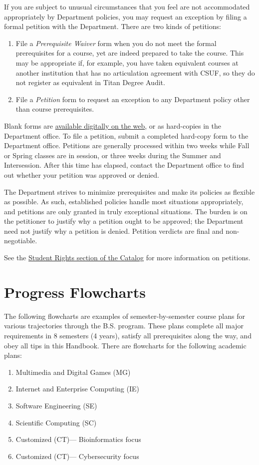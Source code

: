 \documentclass{book}
\newcommand{\campusname}{CSUF}
\newcommand{\mgtrackname}{Multimedia and Digital Games (MG)}
\newcommand{\ietrackname}{Internet and Enterprise Computing (IE)}
\newcommand{\setrackname}{Software Engineering (SE)}
\newcommand{\sctrackname}{Scientific Computing (SC)}
\newcommand{\cttrackname}{Customized (CT)}
\newcommand{\ctbiotrackname}{\cttrackname --- Bioinformatics focus}
\newcommand{\ctsecuritytrackname}{\cttrackname --- Cybersecurity focus}
\begin{document}
If you are subject to unusual circumstances that you feel are not accommodated appropriately by Department policies, you may request an exception by filing a formal petition with the Department. There are two kinds of petitions:
\begin{enumerate}
\item File a \emph{Prerequisite Waiver} form when you do not meet the formal prerequisites for a course, yet are indeed prepared to take the course. This may be appropriate if, for example, you have taken equivalent courses at another institution that has no articulation agreement with \campusname, so they do not register as equivalent in Titan Degree Audit.
\item File a \emph{Petition} form to request an exception to any Department policy other than course prerequisites.
\end{enumerate}

Blank forms are \href{http://fullerton.edu/ecs/cs/resources/formsDocuments.asp}{available digitally on the web}, or as hard-copies in the Department office. To file a petition, submit a completed hard-copy form to the Department office. Petitions are generally processed within two weeks while Fall or Spring classes are in session, or three weeks during the Summer and Intersession. After this time has elapsed, contact the Department office to find out whether your petition was approved or denied.

The Department strives to minimize prerequisites and make its policies as flexible as possible. As such, established policies handle most situations appropriately, and petitions are only granted in truly exceptional situations. The burden is on the petitioner to justify why a petition ought to be approved; the Department need not justify why a petition is denied. Petition verdicts are final and non-negotiable.

See the \href{http://catalog.fullerton.edu/content.php?catoid=2&navoid=115#Student_Rights}{Student Rights section of the Catalog} for more information on petitions.

\chapter{Progress Flowcharts}

The following flowcharts are examples of semester-by-semester course plans for various trajectories through the B.S. program. These plans complete all major requirements in 8 semesters (4 years), satisfy all prerequisites along the way, and obey all tips in this Handbook. There are flowcharts for the following academic plans:
\begin{enumerate}
\item \mgtrackname
\item \ietrackname
\item \setrackname
\item \sctrackname
\item \ctbiotrackname
\item \ctsecuritytrackname
\end{enumerate}
\end{document}
